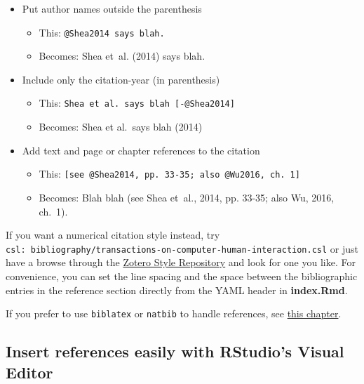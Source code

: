 \documentclass[a4paper, nobind]{templates/ociamthesis}
\providecommand{\tightlist}{%
  \setlength{\itemsep}{0pt}\setlength{\parskip}{0pt}}
\providecommand{\citeproc}[2]{#2}
\begin{document}
\begin{itemize}
\tightlist
\item
  Put author names outside the parenthesis

  \begin{itemize}
  \tightlist
  \item
    This: \texttt{@Shea2014\ says\ blah.}
  \item
    Becomes: Shea et~al. (\citeproc{ref-Shea2014}{2014}) says blah.
  \end{itemize}
\item
  Include only the citation-year (in parenthesis)

  \begin{itemize}
  \tightlist
  \item
    This: \texttt{Shea\ et\ al.\ says\ blah\ {[}-@Shea2014{]}}
  \item
    Becomes: Shea et al.~says blah (\citeproc{ref-Shea2014}{2014})
  \end{itemize}
\item
  Add text and page or chapter references to the citation

  \begin{itemize}
  \tightlist
  \item
    This: \texttt{{[}see\ @Shea2014,\ pp.\ 33-35;\ also\ @Wu2016,\ ch.\ 1{]}}
  \item
    Becomes: Blah blah (see \citeproc{ref-Shea2014}{Shea et~al., 2014, pp. 33-35}; also \citeproc{ref-Wu2016}{Wu, 2016}, ch.~1).
  \end{itemize}
\end{itemize}

If you want a numerical citation style instead, try \texttt{csl:\ bibliography/transactions-on-computer-human-interaction.csl} or just have a browse through the \href{https://www.zotero.org/styles}{Zotero Style Repository} and look for one you like.
For convenience, you can set the line spacing and the space between the bibliographic entries in the reference section directly from the YAML header in \textbf{index.Rmd}.

If you prefer to use \texttt{biblatex} or \texttt{natbib} to handle references, see \hyperref[customising-citations]{this chapter}.

\clearpage

\subsection{Insert references easily with RStudio's Visual Editor}\label{insert-references-easily-with-rstudios-visual-editor}
\end{document}
